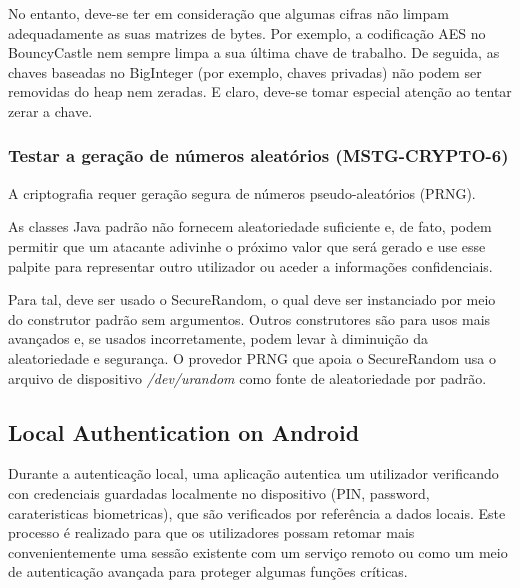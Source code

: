 \par No entanto, deve-se ter em consideração que algumas cifras não limpam adequadamente as suas matrizes de bytes. Por exemplo, a codificação AES no BouncyCastle nem sempre limpa a sua última chave de trabalho. De seguida, as chaves baseadas no BigInteger (por exemplo, chaves privadas) não podem ser removidas do heap nem zeradas. E claro, deve-se tomar especial atenção ao tentar zerar a chave. 



\subsubsection{Testar a geração de números aleatórios (MSTG-CRYPTO-6)}\par
\hfill\par
\hfill\par
\par A criptografia requer geração segura de números pseudo-aleatórios (PRNG).
\par As classes Java padrão não fornecem aleatoriedade suficiente e, de fato, podem permitir que um atacante adivinhe o próximo valor que será gerado e use esse palpite para representar outro utilizador ou aceder a informações confidenciais.

\par Para tal, deve ser usado o SecureRandom, o qual deve ser instanciado por meio do construtor padrão sem argumentos. Outros construtores são para usos mais avançados e, se usados incorretamente, podem levar à diminuição da aleatoriedade e segurança. O provedor PRNG que apoia o SecureRandom usa o arquivo de dispositivo \textit{/dev/urandom} como fonte de aleatoriedade por padrão.






\subsection{Local Authentication on Android}
\par Durante a autenticação local, uma aplicação autentica um utilizador verificando con credenciais guardadas localmente no dispositivo (PIN, password, carateristicas biometricas), que são verificados por referência a dados locais. Este processo é realizado para que os utilizadores possam retomar mais convenientemente uma sessão existente com um serviço remoto ou como um meio de autenticação avançada para proteger algumas funções críticas.



